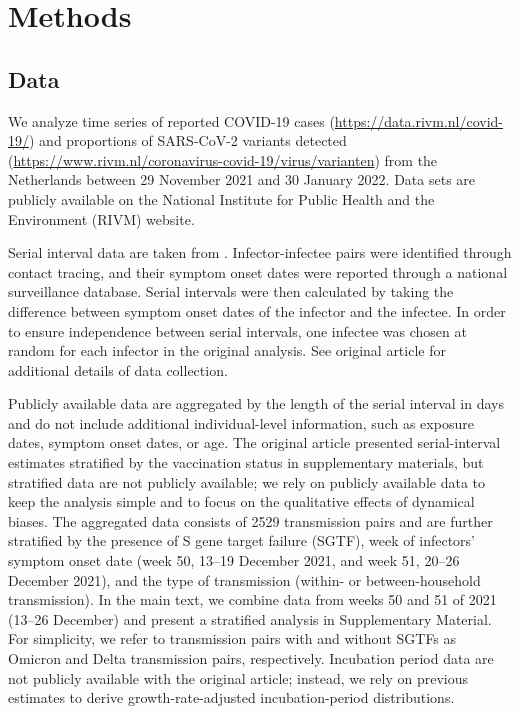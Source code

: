 \documentclass[12pt]{article}
\begin{document}
\section{Methods}

\subsection{Data}

We analyze time series of reported COVID-19 cases (\url{https://data.rivm.nl/covid-19/}) and proportions of SARS-CoV-2 variants detected (\url{https://www.rivm.nl/coronavirus-covid-19/virus/varianten}) from the Netherlands between 29 November 2021 and 30 January 2022.
Data sets are publicly available on the National Institute for Public Health and the Environment (RIVM) website.

Serial interval data are taken from \cite{backer2021omicron}.
Infector-infectee pairs were identified through contact tracing, and their symptom onset dates were reported through a national surveillance database.
Serial intervals were then calculated by taking the difference between symptom onset dates of the infector and the infectee.
In order to ensure independence between serial intervals, one infectee was chosen at random for each infector in the original analysis.
See original article for additional details of data collection.

Publicly available data are aggregated by the length of the serial interval in days and do not include additional individual-level information, such as exposure dates, symptom onset dates, or age.
The original article presented serial-interval estimates stratified by the vaccination status in supplementary materials, but stratified data are not publicly available; we rely on publicly available data to keep the analysis simple and to focus on the qualitative effects of dynamical biases.
The aggregated data consists of 2529 transmission pairs and are further stratified by the presence of S gene target failure (SGTF), week of infectors' symptom onset date (week 50, 13--19 December 2021, and week 51, 20--26 December 2021), and the type of transmission (within- or between-household transmission).
In the main text, we combine data from weeks 50 and 51 of 2021 (13--26 December) and present a stratified analysis in Supplementary Material.
For simplicity, we refer to transmission pairs with and without SGTFs as Omicron and Delta transmission pairs, respectively.
Incubation period data are not publicly available with the original article; instead, we rely on previous estimates \cite{backer2021omicron} to derive growth-rate-adjusted incubation-period distributions.
\end{document}
